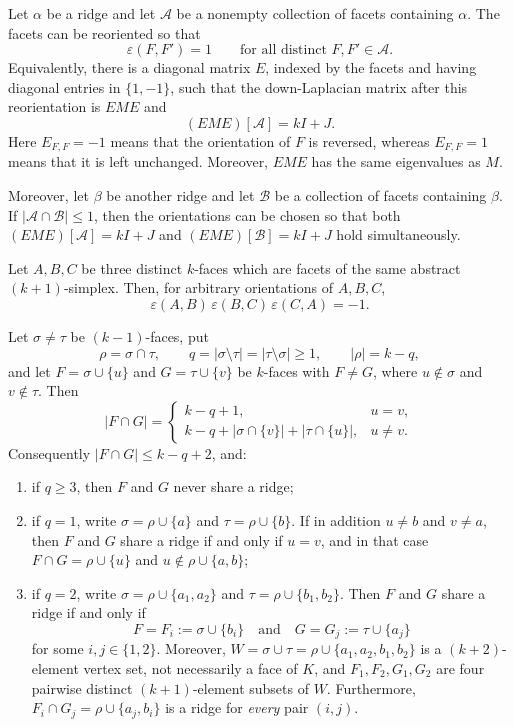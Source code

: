 \documentclass[10pt,a4paper]{amsart}
\newcommand{\Aset}{\mathcal A}
\newcommand{\Bset}{\mathcal B}
\newcommand{\eps}{\varepsilon}
\begin{document}
\begin{lemma}\label{lem:switch}
Let $\alpha$ be a ridge and let $\Aset$ be a nonempty collection of facets containing
$\alpha$. The facets can be reoriented so that
\[
  \eps(F,F')=1\qquad\text{for all distinct }F,F'\in\Aset.
\]
Equivalently, there is a diagonal matrix $E$, indexed by the facets and having diagonal entries
in $\{1,-1\}$, such that the down-Laplacian matrix after this reorientation is $EME$ and
\[
  (EME)[\Aset]=kI+J .
\]
Here $E_{F,F}=-1$ means that the orientation of $F$ is reversed, whereas $E_{F,F}=1$ means that
it is left unchanged. Moreover, $EME$ has the same eigenvalues as $M$.

Moreover, let $\beta$ be another ridge and let $\Bset$ be a collection of facets containing
$\beta$. If $|\Aset\cap\Bset|\le1$, then the orientations can be chosen so that both
$(EME)[\Aset]=kI+J$ and $(EME)[\Bset]=kI+J$ hold simultaneously.
\end{lemma}

\begin{lemma}\label{lem:sign}
Let $A,B,C$ be three distinct $k$-faces which are facets of the same abstract
$(k+1)$-simplex. Then, for arbitrary orientations of $A,B,C$,
\[
  \eps(A,B)\,\eps(B,C)\,\eps(C,A)=-1 .
\]
\end{lemma}

\begin{lemma}\label{lem:adj}
Let $\sigma\ne\tau$ be $(k-1)$-faces, put
\[
  \rho=\sigma\cap\tau,\qquad q=|\sigma\setminus\tau|=|\tau\setminus\sigma|\ge1,
  \qquad |\rho|=k-q ,
\]
and let $F=\sigma\cup\{u\}$ and $G=\tau\cup\{v\}$ be $k$-faces with $F\ne G$, where
$u\notin\sigma$ and $v\notin\tau$. Then
\[
  |F\cap G|=
  \begin{cases}
    k-q+1, & u=v,\\[2pt]
    k-q+|\sigma\cap\{v\}|+|\tau\cap\{u\}|, & u\ne v.
  \end{cases}
\]
Consequently $|F\cap G|\le k-q+2$, and:
\begin{enumerate}[label=\textup{(\alph*)},leftmargin=2.6em]
\item\label{it:adj-a} if $q\ge3$, then $F$ and $G$ never share a ridge;
\item\label{it:adj-b} if $q=1$, write $\sigma=\rho\cup\{a\}$ and $\tau=\rho\cup\{b\}$. If in
addition $u\ne b$ and $v\ne a$, then $F$ and $G$ share a ridge if and only if $u=v$, and in
that case $F\cap G=\rho\cup\{u\}$ and $u\notin\rho\cup\{a,b\}$;
\item\label{it:adj-c} if $q=2$, write $\sigma=\rho\cup\{a_1,a_2\}$ and
$\tau=\rho\cup\{b_1,b_2\}$. Then $F$ and $G$ share a ridge if and only if
\[
  F=F_i:=\sigma\cup\{b_i\}\quad\text{and}\quad G=G_j:=\tau\cup\{a_j\}
\]
for some $i,j\in\{1,2\}$. Moreover,
$W=\sigma\cup\tau=\rho\cup\{a_1,a_2,b_1,b_2\}$ is a $(k+2)$-element vertex set, not
necessarily a face of $K$, and $F_1,F_2,G_1,G_2$ are four pairwise distinct
$(k+1)$-element subsets of $W$. Furthermore,
$F_i\cap G_j=\rho\cup\{a_j,b_i\}$ is a ridge for \emph{every} pair $(i,j)$.
\end{enumerate}
\end{lemma}
\end{document}
